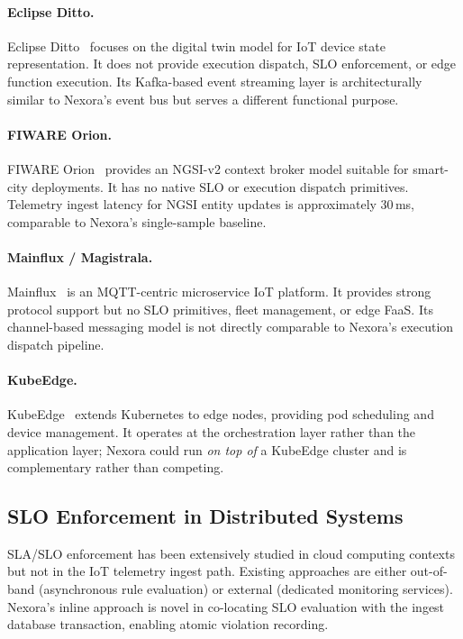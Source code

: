 \documentclass[twocolumn,smallextended]{svjour3}
\begin{document}
\paragraph{Eclipse Ditto.}
Eclipse Ditto~\cite{eclipseditto} focuses on the digital twin model for IoT
device state representation. It does not provide execution dispatch,
SLO enforcement, or edge function execution. Its Kafka-based event streaming
layer is architecturally similar to Nexora's event bus but serves a different
functional purpose.

\paragraph{FIWARE Orion.}
FIWARE Orion~\cite{fiware2016orion} provides an NGSI-v2 context broker model
suitable for smart-city deployments. It has no native SLO or execution dispatch
primitives. Telemetry ingest latency for NGSI entity updates is approximately
30\,ms, comparable to Nexora's single-sample baseline.

\paragraph{Mainflux / Magistrala.}
Mainflux~\cite{mainflux} is an MQTT-centric microservice IoT platform. It
provides strong protocol support but no SLO primitives, fleet management, or
edge FaaS. Its channel-based messaging model is not directly comparable to
Nexora's execution dispatch pipeline.

\paragraph{KubeEdge.}
KubeEdge~\cite{xiong2018kubeedge} extends Kubernetes to edge nodes, providing
pod scheduling and device management. It operates at the orchestration layer
rather than the application layer; Nexora could run \emph{on top of} a
KubeEdge cluster and is complementary rather than competing.

\subsection{SLO Enforcement in Distributed Systems}
SLA/SLO enforcement has been extensively studied in cloud computing
contexts~\cite{wu2011sla} but not in the IoT telemetry ingest path.
Existing approaches are either out-of-band (asynchronous rule evaluation) or
external (dedicated monitoring services). Nexora's inline approach is
novel in co-locating SLO evaluation with the ingest database transaction,
enabling atomic violation recording.
\end{document}
